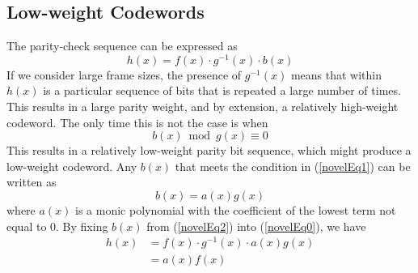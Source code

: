 \subsection{Low-weight Codewords}

The parity-check sequence can be expressed as 
\begin{equation}
h(x) =f(x)\cdot g^{-1}(x)\cdot b(x)
\label{novelEq0}
\end{equation}
If we consider large frame sizes, the presence of $g^{-1}(x)$ means that within $h(x)$ is a particular sequence of bits that is repeated a large number of times. This results in a large parity weight, and by extension, a relatively high-weight codeword. The only time this is not the case is when
\begin{equation}
b(x) \bmod g(x) \equiv 0
\label{novelEq1}
\end{equation}
This results in a relatively low-weight parity bit sequence, which might produce a low-weight codeword. Any $b(x)$ that meets the condition in (\ref{novelEq1}) can be written as 
\begin{equation}
b(x) =a(x)g(x)
\label{novelEq2}
\end{equation}
where $a(x)$ is a monic polynomial with the coefficient of the lowest term not equal to $0$.
By fixing $b(x)$ from (\ref{novelEq2}) into (\ref{novelEq0}), we have 
\begin{equation}
\begin{split}
h(x)&=f(x)\cdot g^{-1}(x)\cdot a(x)g(x)\\
&=a(x)f(x)
\end{split}
\label{novelEq3}
\end{equation}

